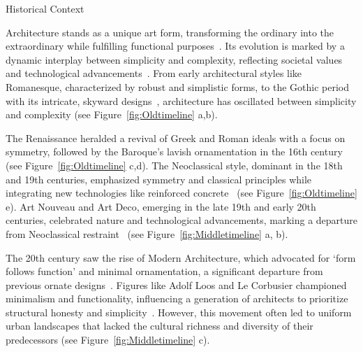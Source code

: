 


Historical Context


Architecture stands as a unique art form, transforming the ordinary into the extraordinary while fulfilling functional purposes~\cite{Hnin2022}.
Its evolution is marked by a dynamic interplay between simplicity and complexity, reflecting societal values and technological advancements~\cite{Economakis2023}.
From early architectural styles like Romanesque, characterized by robust and simplistic forms, to the Gothic period with its intricate, skyward designs~\cite{Stacbond2020}, architecture has oscillated between simplicity and complexity (see Figure~\ref{fig:Oldtimeline} a,b).

The Renaissance heralded a revival of Greek and Roman ideals with a focus on symmetry, followed by the Baroque's lavish ornamentation in the 16th century~\cite{Economakis2023} (see Figure~\ref{fig:Oldtimeline} c,d).
The Neoclassical style, dominant in the 18th and 19th centuries, emphasized symmetry and classical principles while integrating new technologies like reinforced concrete~\cite{Economakis2023} (see Figure~\ref{fig:Oldtimeline} e).
Art Nouveau and Art Deco, emerging in the late 19th and early 20th centuries, celebrated nature and technological advancements, marking a departure from Neoclassical restraint~\cite{Salas2018, Arora2023} (see Figure~\ref{fig:Middletimeline} a, b).

The 20th century saw the rise of Modern Architecture, which advocated for `form follows function' and minimal ornamentation, a significant departure from previous ornate designs~\cite{Gage2015}.
Figures like Adolf Loos and Le Corbusier championed minimalism and functionality, influencing a generation of architects to prioritize structural honesty and simplicity~\cite{Saglam2014}.
However, this movement often led to uniform urban landscapes that lacked the cultural richness and diversity of their predecessors (see Figure~\ref{fig:Middletimeline} c).

